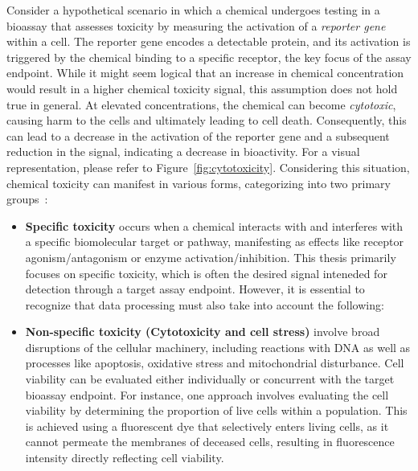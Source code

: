 Consider a hypothetical scenario in which a chemical undergoes testing in a bioassay that assesses toxicity by measuring the activation of a \emph{reporter gene} within a cell. The reporter gene encodes a detectable protein, and its activation is triggered by the chemical binding to a specific receptor, the key focus of the assay endpoint. While it might seem logical that an increase in chemical concentration would result in a higher chemical toxicity signal, this assumption does not hold true in general. At elevated concentrations, the chemical can become \emph{cytotoxic}, causing harm to the cells and ultimately leading to cell death. Consequently, this can lead to a decrease in the activation of the reporter gene and a subsequent reduction in the signal, indicating a decrease in bioactivity. For a visual representation, please refer to Figure~\ref{fig:cytotoxicity}. Considering this situation, chemical toxicity can manifest in various forms, categorizing into two primary groups~\cite{judson2016}: 
\begin{itemize}
    \item \textbf{Specific toxicity} occurs when a chemical interacts with and interferes with a specific biomolecular target or pathway, manifesting as effects like receptor agonism/antagonism or enzyme activation/inhibition. This thesis primarily focuses on specific toxicity, which is often the desired signal inteneded for detection through a target assay endpoint. However, it is essential to recognize that data processing must also take into account the following:
    \item \textbf{Non-specific toxicity (Cytotoxicity and cell stress)} involve broad disruptions of the cellular machinery, including reactions with DNA as well as processes like apoptosis, oxidative stress and mitochondrial disturbance. Cell viability can be evaluated either individually or concurrent with the target bioassay endpoint. For instance, one approach involves evaluating the cell viability by determining the proportion of live cells within a population. This is achieved using a fluorescent dye that selectively enters living cells, as it cannot permeate the membranes of deceased cells, resulting in fluorescence intensity directly reflecting cell viability.
\end{itemize}

